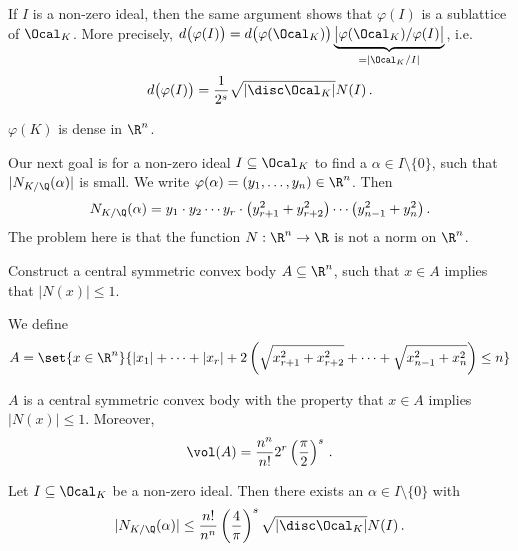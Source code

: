 \begin{rem*}
	If \( I \) is a non-zero ideal, then the same argument shows that \( \varphi(I) \) is a sublattice of \( \Ocal_K \).
	More precisely, \( d\big(\varphi(I)\big) = d \big( \varphi(\Ocal_K) \big) \underbrace{\big| \varphi(\Ocal_K) / \varphi(I) \big|}_{= |\Ocal_K / I|} \), i.e.
	\[ d \big( \varphi(I) \big) = \frac{1}{2^s} \sqrt{|\disc \Ocal_K|} N(I) \,. \]
\end{rem*}

\begin{cor}
	\( \varphi(K) \) is dense in \( \R^n \).
\end{cor}

Our next goal is for a non-zero ideal \( I \subseteq \Ocal_K \) to find a \( \alpha \in I \setminus \{0\} \), such that \( |N_{K / \Q} (\alpha)| \) is small.
We write \( \varphi(\alpha) = (y_1, \dotsc, y_n) \in \R^n \).
Then
\[ N_{K/\Q}(\alpha) = y_1 \cdot y_2 \dotsm y_r \cdot \big( y_{r+1}^2 + y_{r+2}^2 \big) \dotsm \big( y_{n-1}^2 + y_n^2 \big) \,. \]
The problem here is that the function \( N: \R^n \to \R \) is not a norm on \( \R^n \).

\begin{idee*}
	Construct a central symmetric convex body \( A \subseteq \R^n \), such that \( x \in A \) implies that \( |N(x)| \leq 1 \).
\end{idee*}

We define
\[ A = \set{x \in \R^n}{|x_1| + \dots + |x_r| + 2 \left( \sqrt{x_{r+1}^2 + x_{r+2}^2} + \dots + \sqrt{x_{n-1}^2 + x_n^2} \right) \leq n} \]

\begin{lem}
	\( A \) is a central symmetric convex body with the property that \( x \in A \) implies \( |N(x)| \leq 1 \).
	Moreover,
	\[ \vol(A) = \frac{n^n}{n!} 2^r \left( \frac{\pi}{2} \right)^s \,. \]
\end{lem}

\begin{thmn}
	Let \( I \subseteq \Ocal_K \) be a non-zero ideal.
	Then there exists an \( \alpha \in I \setminus \{0\} \) with
	\[ |N_{K/\Q}(\alpha)| \leq \frac{n!}{n^n} \left(\frac{4}{\pi}\right)^s \sqrt{|\disc \Ocal_K|} N(I) \,. \]
\end{thmn}